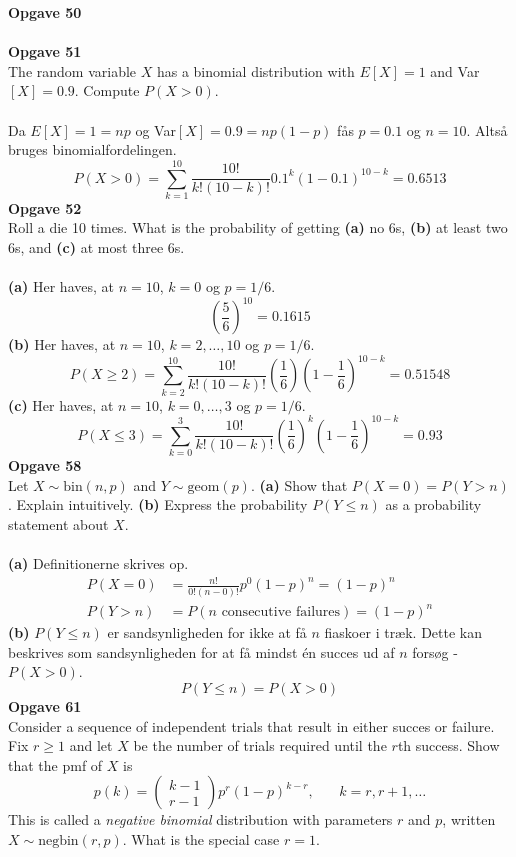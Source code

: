 \documentclass[12pt,a4paper,draft]{report}
\author{Frederik Appel Vardinghus-Nielsen}
\begin{document}
\noindent \textbf{Opgave 50}\\\\
\textbf{Opgave 51}\\
The random variable $X$ has a binomial distribution with $E[X]=1$ and Var$[X]=0.9$. Compute $P(X>0)$.\\\\
Da $E[X]=1=np$ og Var$[X]=0.9=np(1-p)$ fås $p=0.1$ og $n=10$.
Altså bruges binomialfordelingen.
\begin{equation}
P(X>0)=\sum_{k=1}^{10}\frac{10!}{k!(10-k)!}0.1^k(1-0.1)^{10-k}=0.6513
\end{equation}
\textbf{Opgave 52}\\
Roll a die 10 times. What is the probability of getting \textbf{(a)} no 6s, \textbf{(b)} at least two 6s, and \textbf{(c)} at most three 6s.\\\\
\textbf{(a)} Her haves, at $n=10$, $k=0$ og $p=1/6$.
\begin{equation}
\left(\frac{5}{6}\right)^{10}=0.1615
\end{equation}
\textbf{(b)} Her haves, at $n=10$, $k=2,\ldots,10$ og $p=1/6$.
\begin{equation}
P(X\geq 2)=\sum_{k=2}^{10}\frac{10!}{k!(10-k)!}\left(\frac{1}{6}\right)(1-\frac{1}{6})^{10-k}=0.51548
\end{equation}
\textbf{(c)} Her haves, at $n=10$, $k=0,\ldots,3$ og $p=1/6$.
\begin{equation}
P(X\leq 3)=\sum_{k=0}^{3}\frac{10!}{k!(10-k)!}\left(\frac{1}{6}\right)^k(1-\frac{1}{6})^{10-k}=0.93
\end{equation}
\textbf{Opgave 58}\\
Let $X\sim \text{bin}(n,p)$ and $Y\sim \text{geom}(p)$. \textbf{(a)} Show that $P(X=0)=P(Y>n)$. Explain intuitively. \textbf{(b)} Express the probability $P(Y\leq n)$ as a probability statement about $X$.\\\\
\textbf{(a)} Definitionerne skrives op.
\begin{align}
P(X=0)&=\frac{n!}{0!(n-0)!}p^0(1-p)^n=(1-p)^n\\
P(Y>n)&=P(n\text{ consecutive failures})=(1-p)^n
\end{align}
\textbf{(b)} $P(Y\leq n)$ er sandsynligheden for ikke at få $n$ fiaskoer i træk. Dette kan beskrives som sandsynligheden for at få mindst én succes ud af $n$ forsøg - $P(X>0)$.
\begin{equation}
P(Y\leq n)=P(X>0)
\end{equation}
\textbf{Opgave 61}\\
Consider a sequence of independent trials that result in either succes or failure. Fix $r\geq 1$ and let $X$ be the number of trials required until the $r$th success. Show that the pmf of $X$ is
\begin{equation}
p(k)=\begin{pmatrix}
k-1\\
r-1
\end{pmatrix}
p^r(1-p)^{k-r},\phantom{mm}k=r,r+1,\ldots
\end{equation}
This is called a \textit{negative binomial} distribution with parameters $r$ and $p$, written $X\sim \text{negbin}(r,p)$. What is the special case $r=1$.
\end{document}

